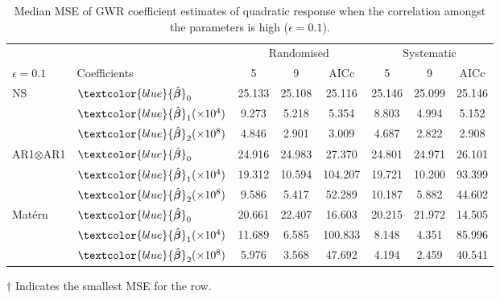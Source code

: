 \documentclass[a4paper]{article} 	%
\newcommand{\Matern}{Mat\'ern }
\newcommand{\zc}[1]{\textcolor{blue}{#1}}
\begin{document}
\begin{table}[!htp]
	\centering
\begin{threeparttable}
	\caption{Median MSE of GWR coefficient estimates of quadratic response when the correlation amongst the parameters is high ($\epsilon=0.1$).}\label{tb:MSEquadraticHigh}
	\begin{tabular}{llcccccc} \toprule
		&  & \multicolumn{3}{c}{Randomised} & \multicolumn{3}{c}{Systematic} \\ 
		$\epsilon=0.1$  & Coefficients & 5  & 9  & AICc & 5  & 9  & AICc \\ \midrule
		\multirow{3}{*}{NS} & $\zc{\hat{\bm{\beta}}}_0$  & 25.133 & 25.108 & 25.116  & 25.146 & 25.099\tnote{$\dagger$} & 25.146 \\
		&$\zc{\hat{\bm{\beta}}}_1 (\times 10^4)$  & 9.273  & 5.218  & 5.354 & 8.803  & 4.994\tnote{$\dagger$}  & 5.152 \\
		&$\zc{\hat{\bm{\beta}}}_2 (\times 10^8)$  & 4.846  & 2.901  & 3.009 & 4.687  & 2.822\tnote{$\dagger$}  & 2.908 \\  \midrule
		\multirow{3}{*}{AR1$\otimes$AR1} & $\zc{\hat{\bm{\beta}}}_0$  & 24.916 & 24.983 & 27.370  & 24.801\tnote{$\dagger$} & 24.971 & 26.101 \\
		& $\zc{\hat{\bm{\beta}}}_1 (\times 10^4)$ & 19.312 & 10.594  & 104.207 & 19.721 & 10.200\tnote{$\dagger$}  & 93.399  \\
		& $\zc{\hat{\bm{\beta}}}_2 (\times 10^8)$  & 9.586  & 5.417\tnote{$\dagger$}  & 52.289  & 10.187  & 5.882  & 44.602  \\  \midrule
		\multirow{3}{*}{\Matern} & $\zc{\hat{\bm{\beta}}}_0$ & 20.661 & 22.407 & 16.603  & 20.215 & 21.972 & 14.505\tnote{$\dagger$}  \\
		& $\zc{\hat{\bm{\beta}}}_1 (\times 10^4)$ & 11.689 & 6.585  & 100.833 & 8.148  & 4.351\tnote{$\dagger$}  & 85.996 \\
		& $\zc{\hat{\bm{\beta}}}_2 (\times 10^8)$  & 5.976  & 3.568  & 47.692  & 4.194  & 2.459\tnote{$\dagger$}  & 40.541  \\ \bottomrule
	\end{tabular}
		    \begin{tablenotes}
	        \item[$\dagger$] \footnotesize Indicates the smallest MSE for the row.
	    \end{tablenotes}
\end{threeparttable}
\end{table}
\end{document}
